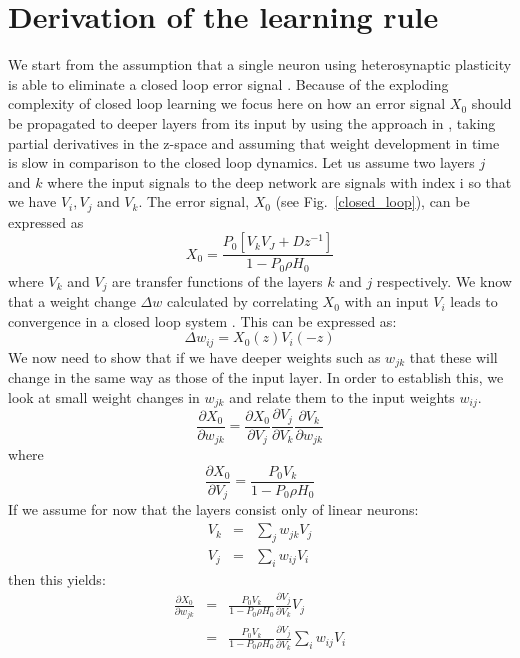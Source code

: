 \documentclass[Afour,sageh,times]{sagej}
\begin{document}
\section{Derivation of the learning rule}
We start from the assumption that a single neuron using heterosynaptic
plasticity is able to eliminate a closed loop error signal
\cite{Porr2006ICO}. Because of the exploding complexity of closed loop
learning we focus here on how an error signal $X_0$ should be propagated
to deeper layers from its input by using the approach in
\cite{Mehta1986}, taking partial derivatives in the z-space and
assuming that weight development in time is slow in comparison to the
closed loop dynamics.  Let us assume two layers $j$ and $k$ where the
input signals to the deep network are signals with index i so that we
have $V_i, V_j$ and $V_k$. The error signal, $X_0$ (see
Fig.~\ref{closed_loop}), can be expressed as
\begin{equation}
  X_0 = \frac{P_0 \left[ V_k V_J + D z^{-1} \right]}{1-P_0 \rho H_0}
\end{equation}
where $V_k$ and $V_j$ are transfer functions of the layers $k$ and $j$
respectively. We know that a weight change $\Delta w$ calculated by
correlating $X_0$ with an input $V_i$ leads to convergence in a closed
loop system \cite{Porr2006ICO}. This can be expressed as:
\begin{equation}
  \Delta w_{ij} = X_0(z) V_i(-z)
\end{equation}
We now need to show that if we have deeper weights such as $w_{jk}$
that these will change in the same way as those of the input layer. In
order to establish this, we look at small weight changes in $w_{jk}$
and relate them to the input weights $w_{ij}$.
\begin{equation}
    \frac{\partial X_0}{\partial w_{jk}} =
    \frac{\partial X_0}{\partial V_j}
    \frac{\partial V_j}{\partial V_k}
    \frac{\partial V_k}{\partial w_{jk}}
\end{equation}    
where
\begin{equation}
\frac{\partial X_0}{\partial V_j} = \frac{P_0 V_k}{1-P_0 \rho H_0}
\end{equation}
If we assume for now that the layers consist only of linear neurons:
\begin{eqnarray}
  V_k &=& \sum_j w_{jk} V_j \\
  V_j &=& \sum_i w_{ij} V_i
\end{eqnarray}
then this yields:
\begin{eqnarray}
    \frac{\partial X_0}{\partial w_{jk}} &=&
    \frac{P_0 V_k}{1-P_0 \rho H_0}
    \frac{\partial V_j}{\partial V_k}
    V_j \\
                                        &=&
    \frac{P_0 V_k}{1-P_0 \rho H_0}
    \frac{\partial V_j}{\partial V_k}
    \sum_i w_{ij} V_i
\end{eqnarray}    
\end{document}
